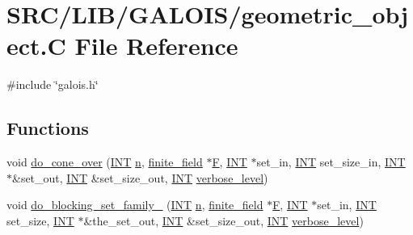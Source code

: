\hypertarget{geometric__object_8_c}{}\section{S\+R\+C/\+L\+I\+B/\+G\+A\+L\+O\+I\+S/geometric\+\_\+object.C File Reference}
\label{geometric__object_8_c}
{\ttfamily \#include \char`\"{}galois.\+h\char`\"{}}\newline
\subsection*{Functions}
\begin{DoxyCompactItemize}
\item 
void \mbox{\hyperlink{geometric__object_8_c_a7bb3ddfb35045392c9df76ad5b0d1753}{do\+\_\+cone\+\_\+over}} (\mbox{\hyperlink{galois_8h_a09fddde158a3a20bd2dcadb609de11dc}{I\+NT}} \mbox{\hyperlink{simeon_8_c_a7f2cd26777ce0ff3fdaf8d02aacbddfb}{n}}, \mbox{\hyperlink{classfinite__field}{finite\+\_\+field}} $\ast$\mbox{\hyperlink{simeon_8_c_a21a61c535ff7d9d4b674461d3b19fffa}{F}}, \mbox{\hyperlink{galois_8h_a09fddde158a3a20bd2dcadb609de11dc}{I\+NT}} $\ast$set\+\_\+in, \mbox{\hyperlink{galois_8h_a09fddde158a3a20bd2dcadb609de11dc}{I\+NT}} set\+\_\+size\+\_\+in, \mbox{\hyperlink{galois_8h_a09fddde158a3a20bd2dcadb609de11dc}{I\+NT}} $\ast$\&set\+\_\+out, \mbox{\hyperlink{galois_8h_a09fddde158a3a20bd2dcadb609de11dc}{I\+NT}} \&set\+\_\+size\+\_\+out, \mbox{\hyperlink{galois_8h_a09fddde158a3a20bd2dcadb609de11dc}{I\+NT}} \mbox{\hyperlink{simeon_8_c_a818073fbcc2f439e7c56952f67386122}{verbose\+\_\+level}})
\item 
void \mbox{\hyperlink{geometric__object_8_c_ae952cf1470f33232439be751e56a07b3}{do\+\_\+blocking\+\_\+set\+\_\+family\+\_}} (\mbox{\hyperlink{galois_8h_a09fddde158a3a20bd2dcadb609de11dc}{I\+NT}} \mbox{\hyperlink{simeon_8_c_a7f2cd26777ce0ff3fdaf8d02aacbddfb}{n}}, \mbox{\hyperlink{classfinite__field}{finite\+\_\+field}} $\ast$\mbox{\hyperlink{simeon_8_c_a21a61c535ff7d9d4b674461d3b19fffa}{F}}, \mbox{\hyperlink{galois_8h_a09fddde158a3a20bd2dcadb609de11dc}{I\+NT}} $\ast$set\+\_\+in, \mbox{\hyperlink{galois_8h_a09fddde158a3a20bd2dcadb609de11dc}{I\+NT}} set\+\_\+size, \mbox{\hyperlink{galois_8h_a09fddde158a3a20bd2dcadb609de11dc}{I\+NT}} $\ast$\&the\+\_\+set\+\_\+out, \mbox{\hyperlink{galois_8h_a09fddde158a3a20bd2dcadb609de11dc}{I\+NT}} \&set\+\_\+size\+\_\+out, \mbox{\hyperlink{galois_8h_a09fddde158a3a20bd2dcadb609de11dc}{I\+NT}} \mbox{\hyperlink{simeon_8_c_a818073fbcc2f439e7c56952f67386122}{verbose\+\_\+level}})

\end{DoxyCompactItemize}

